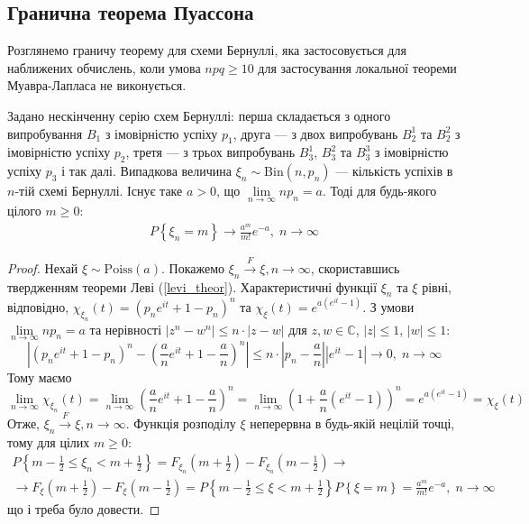 \subsection{Гранична теорема Пуассона}
Розглянемо граничу теорему для схеми Бернуллі, яка застосовується для наближених обчислень, коли умова $npq \geq 10$ 
для застосування локальної теореми Муавра-Лапласа не виконується.
\begin{theorem*}
    Задано нескінченну серію схем Бернуллі: перша складається з одного випробування $B_1$ з імовірністю успіху $p_1$, 
    друга --- з двох випробувань $B_2^1$ та $B_2^2$ з імовірністю успіху $p_2$, 
    третя --- з трьох випробувань $B_3^1$, $B_3^2$ та $B_3^3$ з імовірністю успіху $p_3$ і так далі.
    Випадкова величина $\xi_n \sim \mathrm{Bin}(n, p_n)$ --- кількість успіхів в $n$-тій схемі Бернуллі.
    Існує таке $a > 0$, що $\underset{n\to\infty}{\lim} n p_n = a$.
    Тоді для будь-якого цілого $m \geq 0$:
    \begin{gather}
        P\left\{\xi_n = m\right\} \to \frac{a^m}{m!} e^{-a}, \; n\to \infty
    \end{gather}
\end{theorem*}
\begin{proof}
    Нехай $\xi \sim \mathrm{Poiss}(a)$. Покажемо $\xi_n \overset{F}{\longrightarrow} \xi, n\to\infty$, скориставшись твердженням теореми Леві (\ref{levi_theor}).
    Характеристичні функції $\xi_n$ та $\xi$ рівні, відповідно, $\chi_{\xi_n}(t) = \left(p_n e^{it} + 1 - p_n \right)^n$ та $\chi_{\xi}(t) = e^{a\left( e^{it} - 1\right)}$.
    З умови $\underset{n\to\infty}{\lim} n p_n = a$ та нерівності $\left| z^n - w^n\right| \leq n\cdot\left| z - w\right|$ для $z, w \in \mathbb{C}$, $|z|\leq1$, $|w|\leq1$:
    $$
    \left| \left(p_n e^{it} + 1 - p_n \right)^n - \left(\frac{a}{n} e^{it} + 1 - \frac{a}{n} \right)^n\right| \leq
    n \cdot \left| p_n - \frac{a}{n}\right| \left| e^{it} - 1\right| \to 0, \; n\to\infty
    $$
    Тому маємо
    $$
    \underset{n\to\infty}{\lim} \chi_{\xi_n}(t) = \underset{n\to\infty}{\lim} \left(\frac{a}{n} e^{it} + 1 - \frac{a}{n} \right)^n = 
    \underset{n\to\infty}{\lim} \left(1 + \frac{a}{n} \left(e^{it} - 1\right) \right)^n = e^{a\left( e^{it} - 1\right)} = \chi_{\xi}(t)
    $$
    Отже, $\xi_n \overset{F}{\longrightarrow} \xi, n\to\infty$. Функція розподілу $\xi$ неперервна в будь-якій нецілій точці, тому для цілих $m \geq 0$:
    \begin{gather*}
        P\left\{ m - \frac{1}{2} \leq \xi_n < m + \frac{1}{2}\right\} = F_{\xi_n}\left( m + \frac{1}{2}\right) -
        F_{\xi_n}\left( m - \frac{1}{2}\right) \to \\ \to F_{\xi}\left( m + \frac{1}{2}\right) -
        F_{\xi}\left( m - \frac{1}{2}\right) = P\left\{ m - \frac{1}{2} \leq \xi < m + \frac{1}{2}\right\}
        P\left\{ \xi = m\right\} = \frac{a^m}{m!} e^{-a}, \; n\to \infty
    \end{gather*}
    що і треба було довести.
\end{proof}
